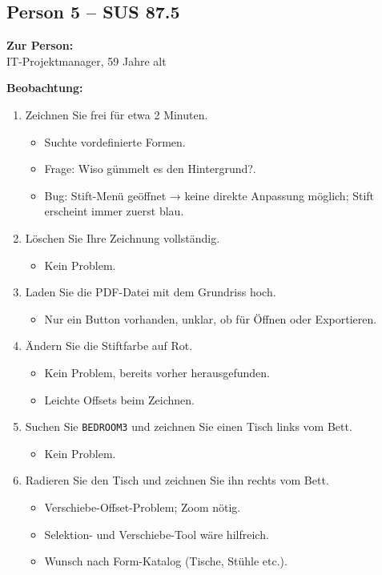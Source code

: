 \subsection{Person 5 – SUS 87.5}  
\textbf{Zur Person:}\\
IT-Projektmanager, 59 Jahre alt  

\textbf{Beobachtung:}  
\begin{enumerate}
    \item Zeichnen Sie frei für etwa 2 Minuten.
    \begin{itemize}
        \item Suchte vordefinierte Formen.
        \item Frage: Wiso gümmelt es den Hintergrund?.
        \item Bug: Stift-Menü geöffnet → keine direkte Anpassung möglich; Stift erscheint immer zuerst blau.
    \end{itemize}

    \item Löschen Sie Ihre Zeichnung vollständig.
    \begin{itemize}
        \item Kein Problem.
    \end{itemize}

    \item Laden Sie die PDF-Datei mit dem Grundriss hoch.
    \begin{itemize}
        \item Nur ein Button vorhanden, unklar, ob für Öffnen oder Exportieren.
    \end{itemize}

    \item Ändern Sie die Stiftfarbe auf Rot.
    \begin{itemize}
        \item Kein Problem, bereits vorher herausgefunden.
        \item Leichte Offsets beim Zeichnen.
    \end{itemize}

    \item Suchen Sie \texttt{BEDROOM3} und zeichnen Sie einen Tisch links vom Bett.
    \begin{itemize}
        \item Kein Problem.
    \end{itemize}

    \item Radieren Sie den Tisch und zeichnen Sie ihn rechts vom Bett.
    \begin{itemize}
        \item Verschiebe-Offset-Problem; Zoom nötig.
        \item Selektion- und Verschiebe-Tool wäre hilfreich.
        \item Wunsch nach Form-Katalog (Tische, Stühle etc.).
    \end{itemize}


\end{enumerate}
